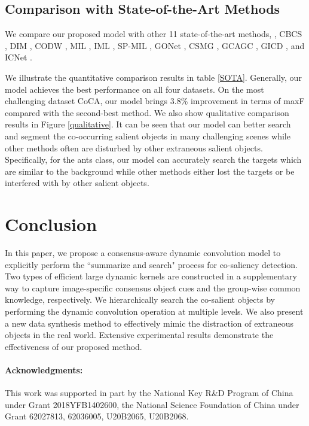\documentclass[10pt,twocolumn,letterpaper]{article}
\begin{document}
\subsection{Comparison with State-of-the-Art Methods}
We compare our proposed model with other 11 state-of-the-art methods, \ie, CBCS \cite{fu2013cluster}, DIM \cite{zhang2015cosaliency}, CODW \cite{zhang2015co}, MIL \cite{zhang2015self}, IML \cite{ren2020co}, SP-MIL \cite{zhang2016co}, GONet \cite{hsu2018unsupervised}, CSMG \cite{zhang2019co}, GCAGC \cite{zhang2020adaptive}, GICD \cite{zhang2020gicd} , and ICNet \cite{jin2020icnet}.

We illustrate the quantitative comparison results in table \ref{SOTA}. Generally, our model achieves the best performance on all four datasets.
On the most challenging dataset CoCA, our model brings 3.8\% improvement in terms of maxF compared with the second-best method.
We also show qualitative comparison results in Figure \ref{qualitative}. It can be seen that our model can better search and segment the co-occurring salient objects in many challenging scenes while other methods often are disturbed by other extraneous salient objects.
Specifically, for the ants class, our model can accurately search the targets which are similar to the background while other methods either lost the targets or be interfered with by other salient objects.


\section{Conclusion}
In this paper, we propose a consensus-aware dynamic convolution model to explicitly perform the ``summarize and search" process for co-saliency detection. Two types of efficient large dynamic kernels are constructed in a supplementary way to capture image-specific consensus object cues and the group-wise common knowledge, respectively.
We hierarchically search the co-salient objects by performing the dynamic convolution operation at multiple levels.
We also present a new data synthesis method to effectively mimic the distraction of extraneous objects in the real world. Extensive experimental results demonstrate the effectiveness of our proposed method.


\vspace{-4mm}
\paragraph{Acknowledgments:}
This work was supported in part by the National Key R\&D Program of China under Grant 2018YFB1402600, the National Science Foundation of China under Grant 62027813, 62036005, U20B2065, U20B2068.


{\small


}
\end{document}
